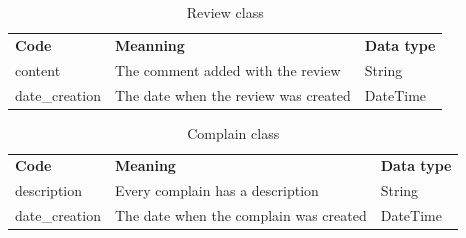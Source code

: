 \documentclass[12pt,a4paper]{report}
\begin{document}
	\begin{table}[H]
		\begin{center}
			\captionsetup[table]{skip=10pt}
			\caption{Review class}
			\setlength\doublerulesep{0.5pt}
			
			\begin{tabular}{|  p{5cm}|  p{6cm}|  p{4cm}|}
				\rowcolor{LightCyan}
				
				\hline
				\multicolumn{3}{c}{Review class}\\
				\hline 
				\textbf{Code} & \textbf{Meanning} & \textbf{Data type} 
				\\ \hline
				
				content &                        
				The comment added with the review &                        
				String  
				\\ \hline
				
				date\_creation &                        
				The date when the review was created &                        
				DateTime                    
				
				\\ \hline
				
				
			\end{tabular}
			
		\end{center}
	\end{table}
	\begin{table}[H]
		\begin{center}
			\captionsetup[table]{skip=10pt}
			\caption{Complain class}
			\setlength\doublerulesep{0.5pt}
			
			\begin{tabular}{|  p{5cm}|  p{6cm}|  p{4cm}|}
				\rowcolor{LightCyan}
				
				\hline
				\multicolumn{3}{c}{Complain class}\\
				\hline 
				\textbf{Code} & \textbf{Meaning} & \textbf{Data type} 
				\\ \hline
				
				description &                        
				Every complain has a description &                        
				String  
				\\ \hline
				
				date\_creation &                        
				The date when the complain was created &                        
				DateTime                    
				
				\\ \hline
				
				
			\end{tabular}
			
		\end{center}
	\end{table}
\end{document}
